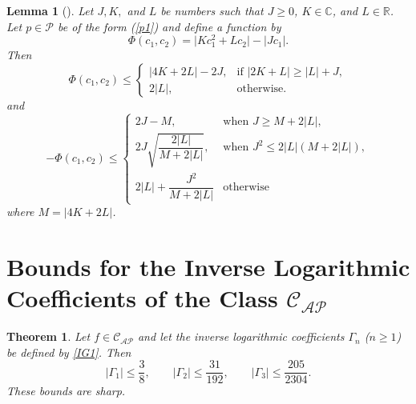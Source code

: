 \documentclass[10pt,a4paper]{amsart}
\newtheorem{theo}{Theorem}[section]
\newtheorem{lem}{Lemma}[section]
\numberwithin{equation}{section}
\begin{document}
\begin{lem}[\cite{SimThomas2020}]\label{L6}
Let $J, K,$ and $L$ be numbers such that $J \geq 0$, $K \in \mathbb{C}$, and $L \in \mathbb{R}$. Let $p \in \mathcal{P}$ be of the form (\ref{p1}) and define a function by
\[
\Phi(c_1,c_2) = \big| K c_1^2 + L c_2 \big| - \big| J c_1 \big|.
\]
Then 
\[
\Phi(c_{1}, c_{2}) \le 
\begin{cases}
|4K + 2L| - 2J, & \text{if } |2K + L| \geq |L| + J, \\[6pt]
2|L|, & \text{otherwise.}
\end{cases}
\]
and
\[
-\Phi(c_1,c_2) \leq 
\begin{cases}
2J - M, & \text{when } J \geq M + 2|L|, \\[6pt]
2J \sqrt{\dfrac{ 2|L|}{M + 2|L|}}, & \text{when } J^2 \leq 2|L|(M + 2|L|), \\[10pt]
2|L| +\dfrac{ J^2}{M + 2|L|} & \text{otherwise}
\end{cases}
\]
where $M=|4K+2L|$.
\end{lem}

\section{Bounds for the Inverse Logarithmic Coefficients of the Class $\mathcal{C}_{\mathcal{AP}}$}
\begin{theo}\label{T1}
Let $f \in \mathcal{C}_{\mathcal{AP}}$ and let the inverse logarithmic coefficients $\Gamma_n$ ($n \geq 1$) be defined by \eqref{IG1}. Then 
\[
|\Gamma_1| \le \frac{3}{8}, \qquad |\Gamma_2| \le \frac{31}{192}, \qquad |\Gamma_3| \le \frac{205}{2304}.
\]
These bounds are sharp.
\end{theo}
\end{document}
